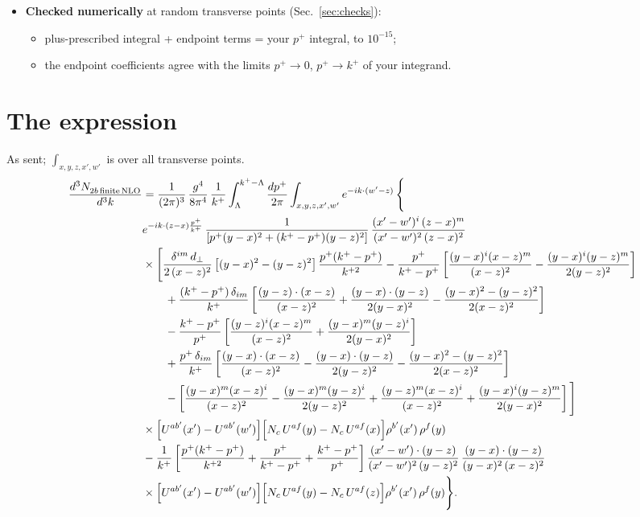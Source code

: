 \documentclass[10pt]{article}
\begin{document}
\begin{itemize}
\item \textbf{Checked numerically} at random transverse points (Sec.~\ref{sec:checks}):
\begin{itemize}
\item plus-prescribed integral + endpoint terms = your $p^+$ integral, to $10^{-15}$;
\item the endpoint coefficients agree with the limits $p^+\to0$, $p^+\to k^+$ of your integrand.
\end{itemize}
\end{itemize}

\section{The expression}
As sent; $\int_{x,y,z,x',w'}$ is over all transverse points.
\begin{align}\label{eq:input}
\frac{d^{3}N_{2b\,\rm finite\, NLO}^{\rm}}{d^{3}k} & = \frac{1}{(2\pi)^{3}}\,\frac{g^{4}}{8\pi^{4}}\,\frac{1}{k^{+}}\int_{\Lambda}^{k^{+}-\Lambda}\frac{dp^{+}}{2\pi}\int_{x,y,z,x',w'}e^{-ik\cdot(w'-z)}\,\Bigg\{\notag\\
&e^{-ik\cdot(z-x)\frac{p^{+}}{k^{+}}}\,\frac{1}{\left[p^{+}(y-x)^{2}+(k^{+}-p^{+})(y-z)^{2}\right]}\,\frac{(x'-w')^{i}\,(z-x)^{m}}{(x'-w')^{2}\,(z-x)^{2}}\notag\\
&\times\Bigg[\frac{\delta^{im}\,d_{\perp}}{2\,(x-z)^{2}}\left[(y-x)^{2}-(y-z)^{2}\right]\frac{p^{+}(k^{+}-p^{+})}{k^{+2}}
-\frac{p^{+}}{k^{+}-p^{+}}\left[\frac{(y-x)^{i}(x-z)^{m}}{(x-z)^{2}}-\frac{(y-x)^{i}(y-z)^{m}}{2(y-z)^{2}}\right]\notag\\
&\qquad+\frac{(k^{+}-p^{+})\,\delta_{im}}{k^{+}}\left[\frac{(y-z)\cdot(x-z)}{(x-z)^{2}}+\frac{(y-x)\cdot(y-z)}{2(y-x)^{2}}-\frac{(y-x)^{2}-(y-z)^{2}}{2(x-z)^{2}}\right]\notag\\
&\qquad-\frac{k^{+}-p^{+}}{p^{+}}\left[\frac{(y-z)^{i}(x-z)^{m}}{(x-z)^{2}}+\frac{(y-x)^{m}(y-z)^{i}}{2(y-x)^{2}}\right]\notag\\
&\qquad+\frac{p^{+}\,\delta_{im}}{k^{+}}\left[\frac{(y-x)\cdot(x-z)}{(x-z)^{2}}-\frac{(y-x)\cdot(y-z)}{2(y-z)^{2}}-\frac{(y-x)^{2}-(y-z)^{2}}{2(x-z)^{2}}\right]\notag\\
&\qquad-\left[\frac{(y-x)^{m}(x-z)^{i}}{(x-z)^{2}}-\frac{(y-x)^{m}(y-z)^{i}}{2(y-z)^{2}}+\frac{(y-z)^{m}(x-z)^{i}}{(x-z)^{2}}+\frac{(y-x)^{i}(y-z)^{m}}{2(y-x)^{2}}\right]\Bigg]\notag\\
&\times\Big[U^{ab'}(x')-U^{ab'}(w')\Big]\Big[N_{c}\,U^{af}(y)-N_{c}\,U^{af}(x)\Big]\rho^{b'}(x')\,\rho^{f}(y)\notag\\
&-\frac{1}{k^{+}}\left[\frac{p^{+}(k^{+}-p^{+})}{k^{+2}}+\frac{p^{+}}{k^{+}-p^{+}}+\frac{k^{+}-p^{+}}{p^{+}}\right]
\frac{(x'-w')\cdot(y-z)}{(x'-w')^{2}\,(y-z)^{2}}\,\frac{(y-x)\cdot(y-z)}{(y-x)^{2}\,(x-z)^{2}}\notag\\
&\times\Big[U^{ab'}(x')-U^{ab'}(w')\Big]\Big[N_{c}\,U^{af}(y)-N_{c}\,U^{af}(z)\Big]\rho^{b'}(x')\,\rho^{f}(y)\Bigg\}.
\end{align}
\end{document}
